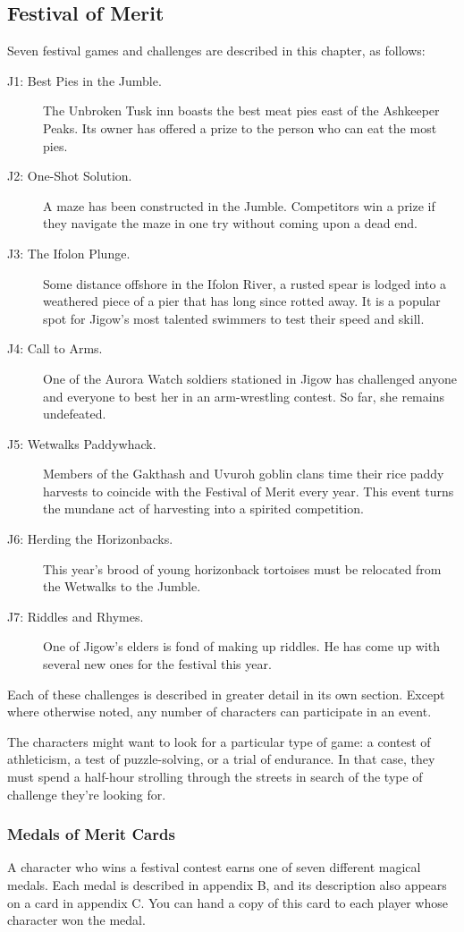 \documentclass[10pt,a4paper,twoside,bg=print,twocolumn,openany,nodeprecatedcode]{dndbook}
\begin{document}
\subsection{Festival of Merit}
Seven festival games and challenges are described in this chapter, as follows:


\begin{description}
\item[J1: Best Pies in the Jumble.]
The Unbroken Tusk inn boasts the best meat pies east of the Ashkeeper Peaks. Its owner has offered a prize to the person who can eat the most pies.
\item[J2: One-Shot Solution.]
A maze has been constructed in the Jumble. Competitors win a prize if they navigate the maze in one try without coming upon a dead end.
\item[J3: The Ifolon Plunge.]
Some distance offshore in the Ifolon River, a rusted spear is lodged into a weathered piece of a pier that has long since rotted away. It is a popular spot for Jigow's most talented swimmers to test their speed and skill.
\item[J4: Call to Arms.]
One of the Aurora Watch soldiers stationed in Jigow has challenged anyone and everyone to best her in an arm-wrestling contest. So far, she remains undefeated.
\item[J5: Wetwalks Paddywhack.]
Members of the Gakthash and Uvuroh goblin clans time their rice paddy harvests to coincide with the Festival of Merit every year. This event turns the mundane act of harvesting into a spirited competition.
\item[J6: Herding the Horizonbacks.]
This year's brood of young horizonback tortoises must be relocated from the Wetwalks to the Jumble.
\item[J7: Riddles and Rhymes.]
One of Jigow's elders is fond of making up riddles. He has come up with several new ones for the festival this year.
\end{description}

Each of these challenges is described in greater detail in its own section. Except where otherwise noted, any number of characters can participate in an event.

The characters might want to look for a particular type of game: a contest of athleticism, a test of puzzle-solving, or a trial of endurance. In that case, they must spend a half-hour strolling through the streets in search of the type of challenge they're looking for.

\subsubsection{Medals of Merit Cards}
A character who wins a festival contest earns one of seven different magical medals. Each medal is described in appendix B, and its description also appears on a card in appendix C. You can hand a copy of this card to each player whose character won the medal.
\end{document}
